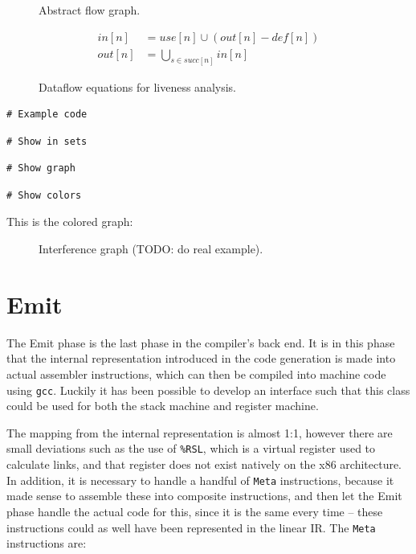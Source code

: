 \begin{figure}[H]
    \centering
    
    \caption{Abstract flow graph.}
\end{figure}

\begin{figure}[H]
    \begin{align*}
        in[n] &= use[n] \cup (out[n] - def[n])\\
        out[n] &= \bigcup\limits_{s \in succ[n]} in[n]
    \end{align*}
    \caption{Dataflow equations for liveness analysis.}
\end{figure}


\begin{verbatim}
# Example code
\end{verbatim}

\begin{verbatim}
# Show in sets
\end{verbatim}

\begin{verbatim}
# Show graph
\end{verbatim}

\begin{verbatim}
# Show colors
\end{verbatim}

This is the colored graph:
\begin{figure}[H]
    \centering
    
    \caption{Interference graph (TODO: do real example).}
\end{figure}

\newpage

\section{Emit}
The Emit phase is the last phase in the compiler's back end. It is in this phase that the internal representation introduced in the code generation is made into actual assembler instructions, which can then be compiled into machine code using \texttt{gcc}. Luckily it has been possible to develop an interface such that this class could be used for both the stack machine and register machine.

The mapping from the internal representation is almost 1:1, however there are small deviations such as the use of \texttt{\%RSL}, which is a virtual register used to calculate links, and that register does not exist natively on the x86 architecture. In addition, it is necessary to handle a handful of \texttt{Meta} instructions, because it made sense to assemble these into composite instructions, and then let the Emit phase handle the actual code for this, since it is the same every time -- these instructions could as well have been represented in the linear IR. The \texttt{Meta} instructions are:

